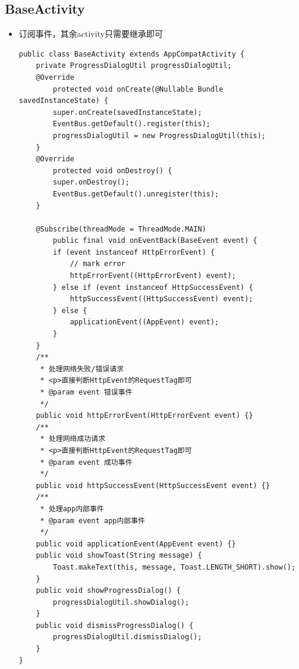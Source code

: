 \documentclass[9pt, b5paper]{article}
\begin{document}
\subsection{BaseActivity}
\label{sec-4-9}
\begin{itemize}
\item 订阅事件，其余activity只需要继承即可
\begin{verbatim}
public class BaseActivity extends AppCompatActivity {
    private ProgressDialogUtil progressDialogUtil;
    @Override
        protected void onCreate(@Nullable Bundle savedInstanceState) {
        super.onCreate(savedInstanceState);
        EventBus.getDefault().register(this);
        progressDialogUtil = new ProgressDialogUtil(this);
    }
    @Override
        protected void onDestroy() {
        super.onDestroy();
        EventBus.getDefault().unregister(this);
    }

    @Subscribe(threadMode = ThreadMode.MAIN)
        public final void onEventBack(BaseEvent event) {
        if (event instanceof HttpErrorEvent) {
            // mark error
            httpErrorEvent((HttpErrorEvent) event);
        } else if (event instanceof HttpSuccessEvent) {
            httpSuccessEvent((HttpSuccessEvent) event);
        } else {
            applicationEvent((AppEvent) event);
        }
    }
    /**
     * 处理网络失败/错误请求
     * <p>直接判断HttpEvent的RequestTag即可
     * @param event 错误事件
     */
    public void httpErrorEvent(HttpErrorEvent event) {}
    /**
     * 处理网络成功请求
     * <p>直接判断HttpEvent的RequestTag即可
     * @param event 成功事件
     */
    public void httpSuccessEvent(HttpSuccessEvent event) {}
    /**
     * 处理app内部事件
     * @param event app内部事件
     */
    public void applicationEvent(AppEvent event) {}
    public void showToast(String message) {
        Toast.makeText(this, message, Toast.LENGTH_SHORT).show();
    }
    public void showProgressDialog() {
        progressDialogUtil.showDialog();
    }
    public void dismissProgressDialog() {
        progressDialogUtil.dismissDialog();
    }
}
\end{verbatim}
\end{itemize}
\end{document}
